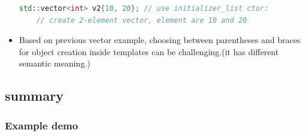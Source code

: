 \documentclass[a4paper,12pt,twoside]{book}
\begin{document}
\begin{itemize}
\begin{lstlisting}[frame=single, language=c++,mathescape=true]
	std::vector<int> v2{10, 20}; // use initializer_list ctor:
	// create 2-element vector, element are 10 and 20
	\end{lstlisting}
	
	\item Based on previous vector example, choosing between parentheses and braces for object creation inside templates can be challenging.(it has different semantic meaning.)
	
\end{itemize}


\subsection{summary}

\subsubsection{Example demo}
\end{document}
